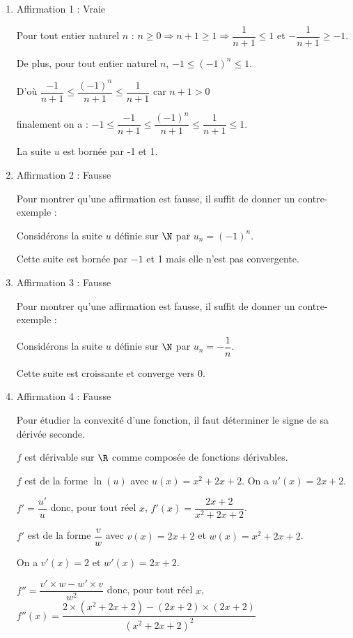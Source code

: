 \medskip

\begin{enumerate}
\item Affirmation 1 : Vraie

Pour tout entier naturel $n$ : $n\geqslant 0 \Longrightarrow n+1 \geqslant 1 \Longrightarrow \dfrac{1}{n+1} \leqslant 1$  et  $-\dfrac{1}{n+1} \geqslant -1$.

De plus,  pour tout entier naturel $n$, $-1 \leqslant (-1)^n \leqslant 1 $.

D'où $ \dfrac{-1}{n+1} \leqslant \dfrac{(-1)^n}{n+1} \leqslant \dfrac{1}{n+1}$ car $n+1 >0$

finalement on a : $-1 \leqslant \dfrac{-1}{n+1} \leqslant \dfrac{(-1)^n}{n+1} \leqslant \dfrac{1}{n+1}\leqslant 1$.

La suite $u$ est bornée par -1 et 1.

\item Affirmation 2 : Fausse

Pour montrer qu'une affirmation est fausse, il suffit de donner un contre-exemple :

Considérons la suite $u$ définie sur $\N$ par $u_n= (-1)^n$.

Cette suite est bornée par $-1$ et 1 mais elle n'est pas convergente.

\item Affirmation 3 : Fausse

Pour montrer qu'une affirmation est fausse, il suffit de donner un contre-exemple :

Considérons la suite $u$ définie sur $\N$ par $u_n=-\dfrac{1}{n}$.

Cette suite est croissante et converge vers 0.

\item Affirmation 4 : Fausse 

Pour étudier la convexité d'une fonction,  il faut déterminer le signe de sa dérivée seconde. 

$f$ est dérivable sur $\R$ comme composée de fonctions dérivables.

$f$ est de la forme $\ln(u)$ avec $u(x)=x^2+2x+2$.  On a $u'(x)=2x+2$.

$f'=\dfrac{u'}{u}$ donc, pour tout réel $x$, $f'(x)=\dfrac{2x+2}{x^2+2x+2}$.

$f'$ est de la forme $\dfrac{v}{w}$ avec $v(x)=2x+2$ et $w(x)=x^2+2x+2$.

On a $v'(x)=2$ et $w'(x)=2x+2$.

$f''= \dfrac{v'\times w - w'\times v}{w^2}$  donc,  pour tout réel $x$,  $f''(x) =\dfrac { 2\times (x^2+2x+2)- (2x+2)\times(2x+2)    }{ {\left( x^2+2x+2 \right)}^2}$ 


\end{enumerate}
